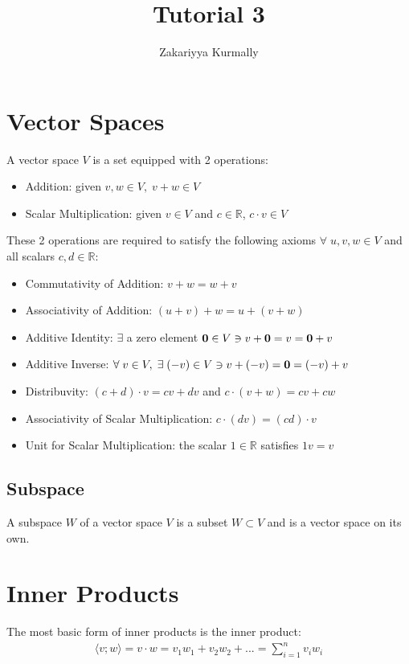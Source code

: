 \documentclass{article}
\author{Zakariyya Kurmally}
\title{Tutorial 3}
\newcommand{\real}{\mathbb{R}}
\begin{document}
\maketitle

\pagebreak

\section{Vector Spaces}
A vector space $V$ is a set equipped with 2 operations:
\begin{itemize}
  \item Addition: given $ v, w \in V, \; v + w  \in V$
  \item Scalar Multiplication: given $ v \in V $ and $ c \in \real $,
    $ c \cdot v \in V $
\end{itemize}

These 2 operations are required to satisfy the following axioms
$ \forall \; u, v, w \in V $ and all scalars $ c, d \in \real $:
\begin{itemize}
  \item Commutativity of Addition: $ v + w = w + v $
  \item Associativity of Addition: $ (u + v) + w = u + (v + w) $
  \item Additive Identity: $ \exists $ a zero element $ \bold{0} 
    \in V \ni v + \bold{0} = v = \bold{0} + v$
  \item Additive Inverse: $ \forall \; v \in V, \; \exists \; (-v) \in V
    \ni v + (-v) = \bold{0} = (-v) + v $
  \item Distribuvity: $ (c + d) \cdot v = cv + dv $ and $ c \cdot (v + w) = cv + cw $
  \item Associativity of Scalar Multiplication:
    $ c \cdot (dv) = (cd) \cdot v $
  \item Unit for Scalar Multiplication: the scalar $ 1 \in \real $
    satisfies $ 1 v = v $
\end{itemize}

\subsection{Subspace}
A subspace $ W $ of a vector space $ V $ is a subset $ W \subset V $
and is a vector space on its own.

\section{Inner Products}
The most basic form of inner products is the inner product:
\begin{gather*}
  \langle v; w \rangle = v \cdot w = v_1 w_1 + v_2 w_2 + ... =
  \sum_{i = 1}^{n} v_i w_i
\end{gather*}
\end{document}
